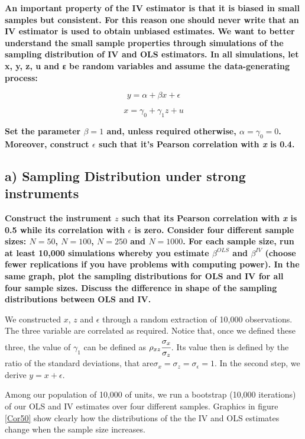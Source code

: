 \documentclass[a4paper,12pt,oneside,English]{article}
\begin{document}
\textbf{An important property of the IV estimator is that it is biased in small samples but consistent. For this reason one should never write that an IV estimator is used to obtain unbiased estimates. We want to better understand the small sample properties through simulations of the sampling distribution of IV and OLS estimators. In all simulations, let x, y, z, u and ε be random variables and assume the data-generating process:}

\begin{equation}
    y = \alpha+\beta x+ \epsilon
\end{equation}

\begin{equation}
    x = \gamma_0+\gamma_1z+ u
\end{equation}

\textbf{Set the parameter $\beta = 1$ and, unless required otherwise, $\alpha = \gamma_0 = 0$. Moreover, construct $\epsilon$ such that it's Pearson correlation with \textit{x} is 0.4.}


\subsection{a) Sampling Distribution under strong instruments}

\textbf{Construct the instrument $z$ such that its Pearson correlation with \textit{x} is 0.5 while its correlation with $\epsilon$ is zero. Consider four different sample sizes: $N = 50$, $N = 100$, $N = 250$ and $N = 1000$. For each sample size, run at least 10,000 simulations whereby you estimate $\beta^{OLS}$ and $\beta^{IV}$ (choose fewer replications if you have problems with computing power). In the same graph, plot the sampling distributions for OLS and IV for all four sample sizes. Discuss the difference in shape of the sampling distributions between OLS and IV.}

We constructed $x$, $z$ and $\epsilon$ through a random extraction of 10,000 observations. The three variable are correlated as required. Notice that, once we defined these three, the value of $\gamma_1$ can be defined as $\rho_{xz}\cfrac{\sigma_x}{\sigma_z}$. Its value then is defined by the ratio of the standard deviations, that are$\sigma_x=\sigma_z=\sigma_\epsilon=1$. In the second step, we derive $y=x+\epsilon$.

Among our population of 10,000 of units, we run a bootstrap (10,000 iterations) of our OLS and IV estimates over four different samples.
Graphics in figure \ref{Cor50} show clearly how the distributions of the the IV and OLS estimates change when the sample size increases.
\end{document}
